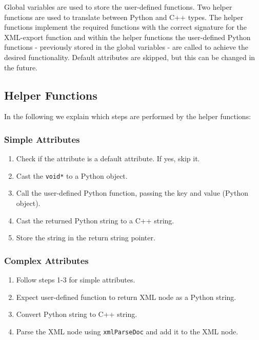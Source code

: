 Global variables are used to store the user-defined functions. Two helper functions are used to translate between Python and C++ types. The helper functions implement the required functions with the correct signature for the XML-export function and within the helper functions the user-defined Python functions - previously stored in the global variables - are called to achieve the desired functionality. Default attributes are skipped, but this can be changed in the future.

\subsection{Helper Functions}

In the following we explain which steps are performed by the helper functions:

\subsubsection{Simple Attributes}
\begin{enumerate}
\item Check if the attribute is a default attribute. If yes, skip it.
\item Cast the \verb|void*| to a Python object.
\item Call the user-defined Python function, passing the key and value (Python object).
\item Cast the returned Python string to a C++ string.
\item Store the string in the return string pointer.
\end{enumerate}

\subsubsection{Complex Attributes}
\begin{enumerate}
\item Follow steps 1-3 for simple attributes.
\item Expect user-defined function to return XML node as a Python string.
\item Convert Python string to C++ string.
\item Parse the XML node using \verb|xmlParseDoc| \cite{libxml2-docu} and add it to the XML node.
\end{enumerate}


